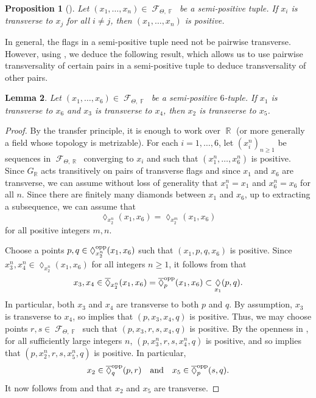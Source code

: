 \documentclass{amsart}
\theoremstyle{plain}
\newtheorem{proposition}{Proposition}[section]
\newtheorem{lemma}[proposition]{Lemma}
\theoremstyle{definition}
\DeclareMathOperator{\Diam}{\lozenge}
\DeclareMathOperator{\Fc}{\mathcal{F}}
\DeclareMathOperator{\Fb}{{\mathbb{F}}}
\DeclareMathOperator{\Rb}{{\mathbb{R}}}
\newcommand{\opp}{\textnormal{opp}}
\newcommand{\1}{\mathbf{1}}
\begin{document}
\begin{proposition}[{\cite[Lemma 13.27]{guichard2025generalizing}}]\label{prop: transverse + semi positive implies positive}
    Let $(x_1,\ldots, x_n) \in \Fc_{\Theta,\Fb}$ be a semi-positive tuple. If $x_i$ is transverse to $x_j$ for all $i \neq j$, then $(x_1,\ldots, x_n)$ is positive.
\end{proposition}

In general, the flags in a semi-positive tuple need not be pairwise transverse. However, using , we deduce the following result, which allows us to use pairwise transversality of certain pairs in a semi-positive tuple to deduce transversality of other pairs.

\begin{lemma}
\label{lem: semi-positive + a bit transverse implies transverse}
    Let $(x_1,\ldots, x_6) \in \Fc_{\Theta,\Fb}$ be a semi-positive $6$-tuple. If $x_1$ is transverse to $x_6$ and $x_3$ is transverse to $x_4$, then $x_2$ is transverse to $x_5$.
\end{lemma}

\begin{proof}
By the transfer principle, it is enough to work over $\Rb$ (or more generally a field whose topology is metrizable). For each $i=1,\dots,6$, let $(x_i^n)_{n\ge 1}$ be sequences in $\Fc_{\Theta,\Rb}$ converging to $x_i$ and such that $(x_1^n,\ldots, x_6^n)$ is positive. Since $G_{\Rb}$ acts transitively on pairs of transverse flags and since $x_1$ and $x_6$ are transverse, we can assume without loss of generality that $x_1^n=x_1$ and $x_6^n = x_6$ for all $n$. Since there are finitely many diamonds between $x_1$ and $x_6$, up to extracting a subsequence, we can assume that 
    \[\Diam_{x_2^n}(x_1,x_6) = \Diam_{x_2^m}(x_1,x_6)\]
    for all positive integers $m,n$. 
    
    Choose a points $p,q \in \Diam_{x_2^n}^\opp(x_1,x_6)$ such that $(x_1,p,q,x_6)$ is positive. Since $x_3^n,x_4^n\in \Diam_{x_2^n}(x_1,x_6)$ for all integers $n\ge 1$, it follows from  that
    \[x_3,x_4\in \overline{\Diam}_{x_2^n}(x_1,x_6)=\overline{\Diam}_p^{\rm opp}(x_1,x_6)\subset\Diam_{x_1}(p,q).\]
    In particular, both $x_3$ and $x_4$ are transverse to both $p$ and $q$. By assumption, $x_3$ is transverse to $x_4$, so  implies that $(p,x_3,x_4,q)$ is positive. Thus, we may choose points $r,s\in\Fc_{\Theta,\Fb}$ such that $(p,x_3,r,s,x_4,q)$ is positive. By the openness in , for all sufficiently large integers $n$, $(p,x_3^n,r,s,x_4^n,q)$ is positive, and so  implies that $(p,x_2^n,r,s,x_5^n,q)$ is positive. In particular, 
    \[x_2\in\overline{\Diam}_q^{\rm opp}(p,r)\quad\text{and}\quad x_5\in\overline{\Diam}_p^{\rm opp}(s,q).\]
    It now follows from  and  that $x_2$ and $x_5$ are transverse. 
\end{proof}
\end{document}
